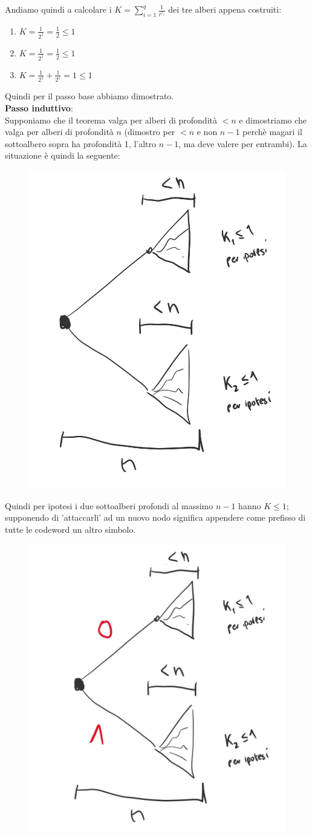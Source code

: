 \begin{dimostrazione}
Andiamo quindi a calcolare i $K = \sum_{i=1}^{q}\frac{1}{r^{\ell_i}}$ dei tre alberi appena costruiti:
\begin{enumerate}
	\item $K=\frac{1}{2^1} = \frac{1}{2} \leq 1$
	\item $K=\frac{1}{2^1} = \frac{1}{2} \leq 1$
	\item $K=\frac{1}{2^1} + \frac{1}{2^1} = 1 \leq 1$
\end{enumerate}

Quindi per il passo base abbiamo dimostrato.\\

\newpage
\textbf{Passo induttivo}:\\
Supponiamo che il teorema valga per alberi di profondità $<n$ e dimostriamo che valga per alberi di profondità $n$ (dimostro per $<n$ e non $n-1$ perchè magari il sottoalbero sopra ha profondità 1, l'altro $n-1$, ma deve valere per entrambi).
La situazione è quindi la seguente:
\begin{figure}[h]
\centering
\includegraphics[width=0.45\linewidth]{immagini/img13}
\end{figure}


Quindi per ipotesi i due sottoalberi profondi al massimo $n-1$ hanno $K \leq 1$; supponendo di 'attaccarli' ad un nuovo nodo significa appendere come prefisso di tutte le codeword un altro simbolo.
\begin{figure}[h]
	\centering
	\includegraphics[width=0.45\linewidth]{immagini/img14}
\end{figure}


\end{dimostrazione}
